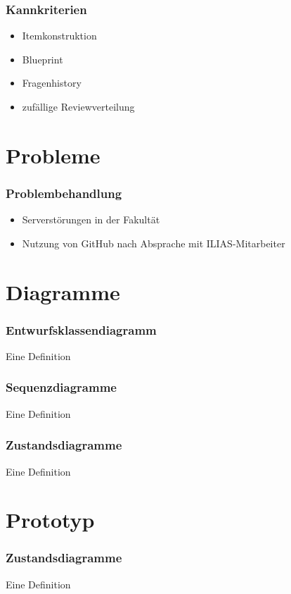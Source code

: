 \documentclass{beamer}
\begin{document}
\begin{frame} %
  \frametitle{Kannkriterien} %
  \begin{itemize}
  	\item Itemkonstruktion
  	\item Blueprint
    \item Fragenhistory
    \item zufällige Reviewverteilung
  \end{itemize}
\end{frame}

\section{Probleme}
\begin{frame} %
  \frametitle{Problembehandlung} %
    \begin{itemize}
    		\item Serverstörungen in der Fakultät 
    		\item Nutzung von GitHub nach Absprache mit ILIAS-Mitarbeiter
    \end{itemize}
\end{frame}

\section{Diagramme}
\begin{frame} %
  \frametitle{Entwurfsklassendiagramm} %
  \begin{Definition} %
    Eine Definition
  \end{Definition}
\end{frame}

\begin{frame} %
  \frametitle{Sequenzdiagramme} %
  \begin{Definition} %
    Eine Definition
  \end{Definition}
\end{frame}

\begin{frame} %
  \frametitle{Zustandsdiagramme} %
  \begin{Definition} %
    Eine Definition
  \end{Definition}
\end{frame}

\section{Prototyp}
\begin{frame} %
  \frametitle{Zustandsdiagramme} %
  \begin{Definition} %
    Eine Definition
  \end{Definition}
\end{frame}
\end{document}
